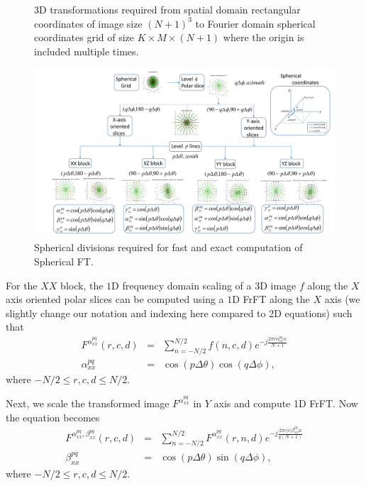 \documentclass{UCF_ETD}
\begin{document}
\begin{figure}[H]
\begin{center}
 \caption{3D transformations required from spatial domain rectangular coordinates of image size $(N+1)^3$ to Fourier domain spherical coordinates grid of size $K \times M \times (N+1)$ where the origin is included multiple times.}
 \label{SphericalPolarTransformation}
 \end{center}
 \end{figure}
 

 \begin{figure}[H]
 \begin{center}
\includegraphics[width=\textwidth]{PolarSphericalDFT/SphericalDivisions}
     \caption{Spherical divisions required for fast and exact computation of Spherical FT.}
     \label{SphericalDivisions.fig}
 \end{center}
 \end{figure}
 
 
 For the $XX$ block,
 the $1$D frequency domain scaling of a $3$D image $f$ along the $X$ axis oriented polar slices can be computed using a $1$D FrFT along the $X$ axis (we slightly change our notation and indexing here compared to 2D equations) such that
 \begin{eqnarray} \label{XXBlockXScaling3DFrFT}
  F^{\alpha^{pq}_{xx}} (r,c,d) & = & \sum\limits_{n=-N/2}^{N/2} f(n,c,d) e^{-j\frac{2\pi r\alpha^{pq}_{xx} n}{N+1}} \nonumber \\
  \alpha^{pq}_{xx} & = & \cos (p\Delta \theta) \cos (q\Delta \phi), %
 \end{eqnarray}
 where $-N/2 \leq r,c,d \leq N/2$.
 
 Next, we scale the transformed image $F^{\alpha^{pq}_{xx}}$ in $Y$ axis and compute 1D FrFT. Now the equation becomes
 \begin{eqnarray} \label{XXBlockXYScaling3DFrFT}
  F^{\alpha^{pq}_{xx}, \beta^{pq}_{xx} }(r,c,d) & = & \sum\limits_{n=-N/2}^{N/2}F^{\alpha^{pq}_{xx}} (r,n,d) e^{-j\frac{2\pi c |c| \beta^{pq}_{xx} n}{q(N+1)}}\nonumber \\
  \beta^{pq}_{xx} & = & \cos (p\Delta \theta) \sin (q\Delta \phi), %
 \end{eqnarray}
 where $-N/2 \leq r,c,d \leq N/2$.
 
\end{document}
